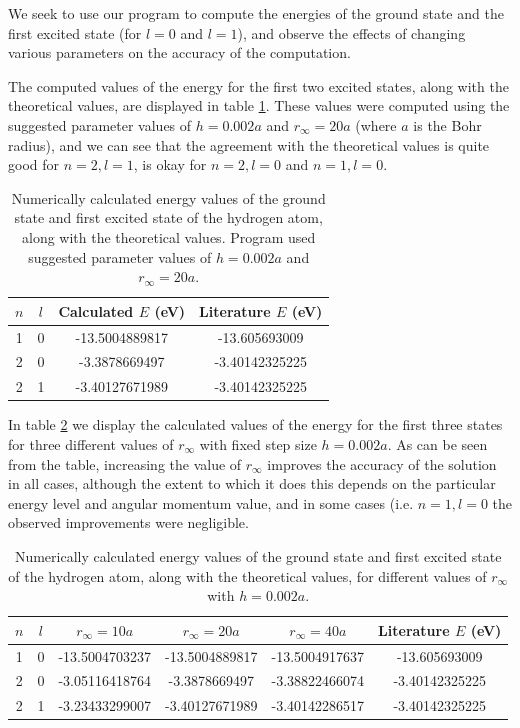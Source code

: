 \documentclass{article}
\begin{document}
We seek to use our program to compute the energies of the ground state and the first excited state (for $l=0$ and $l=1$), and observe the effects of changing various parameters on the accuracy of the computation.

The computed values of the energy for the first two excited states, along with the theoretical values, are displayed in table \ref{tab:2b_i}. These values were computed using the suggested parameter values of $h=0.002a$ and $r_\infty=20a$ (where $a$ is the Bohr radius), and we can see that the agreement with the theoretical values is quite good for $n=2, l=1$, is okay for $n=2, l=0$ and $n=1, l=0$.

\begin{table}[H]
	\centering
	\caption{Numerically calculated energy values of the ground state and first excited state of the hydrogen atom, along with the theoretical values. Program used suggested parameter values of $h=0.002a$ and $r_\infty=20a$.}
	\label{tab:2b_i}
	\begin{tabular}{c|c|c|c}
		$n$ & $l$ & Calculated $E$ (eV)  & Literature $E$ (eV) \\
		\hline
		1 & 0 & -13.5004889817 & -13.605693009 \\
		2 & 0 & -3.3878669497 & -3.40142325225 \\
		2 & 1 & -3.40127671989 & -3.40142325225 \\
	\end{tabular}
\end{table}

In table \ref{tab:2b_ii} we display the calculated values of the energy for the first three states for three different values of $r_\infty$ with fixed step size $h=0.002a$. As can be seen from the table, increasing the value of $r_\infty$ improves the accuracy of the solution in all cases, although the extent to which it does this depends on the particular energy level and angular momentum value, and in some cases (i.e. $n=1, l=0$ the observed improvements were negligible.

\begin{table}[H]
	\centering
	\caption{Numerically calculated energy values of the ground state and first excited state of the hydrogen atom, along with the theoretical values, for different values of $r_\infty$ with $h=0.002a$.}
	\label{tab:2b_ii}
	\begin{tabular}{c|c|c|c|c|c}
		$n$ & $l$ & $r_\infty=10a$ &  $r_\infty=20a$ & $r_\infty=40a$ & Literature $E$ (eV) \\
		\hline
		1 & 0 & -13.5004703237 & -13.5004889817 & -13.5004917637 & -13.605693009 \\
		2 & 0 & -3.05116418764 & -3.3878669497 & -3.38822466074 &  -3.40142325225 \\
		2 & 1 & -3.23433299007 & -3.40127671989 & -3.40142286517 & -3.40142325225 \\
	\end{tabular}
\end{table}
\end{document}
